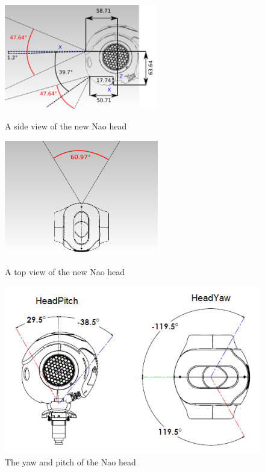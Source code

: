 \documentclass[11pt]{report}
\begin{document}
 \begin{figure}[ht!]
\begin{minipage}[b]{0.5\linewidth}
  \centering
    \includegraphics[width=0.6\textwidth]{../Drawings/naoHead/naoHead.jpg}
    \caption{A side view of the new Nao head \cite{NaoHead}} 
    \label{fig:nao1}
\end{minipage}
\begin{minipage}[b]{0.5\linewidth}
  \centering
    \includegraphics[width=0.6\textwidth]{../Drawings/naoHead/naoHead1.jpg}
    \caption{A top view of the new Nao head \cite{NaoHead}} 
    \label{fig:nao2}
\end{minipage}
\begin{minipage}[b]{0.5\linewidth}
  \centering
    \includegraphics[width=1.0\textwidth]{../Drawings/naoHead/headyawpitch.png}
    \caption{The yaw and pitch of the Nao head \cite{NaoHead}} 
    \label{fig:yawPitch}
\end{minipage}
\end{figure}
\end{document}
